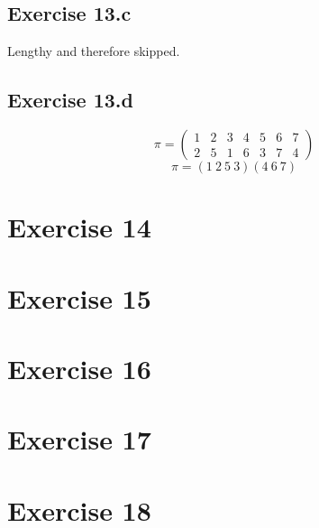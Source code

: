 \documentclass[a4paper]{article}
\theoremstyle{definition}
\begin{document}
\subsection{Exercise 13.c}

Lengthy and therefore skipped.

\subsection{Exercise 13.d}
%
\[
  \pi = \begin{pmatrix}
    1 & 2 & 3 & 4 & 5 & 6 & 7 \\
    2 & 5 & 1 & 6 & 3 & 7 & 4
  \end{pmatrix}
\] \[
  \pi = (1\ 2\ 5\ 3) (4\ 6\ 7)
\]

\section{Exercise 14}
\section{Exercise 15}
\section{Exercise 16}
\section{Exercise 17}
\section{Exercise 18}
\end{document}
